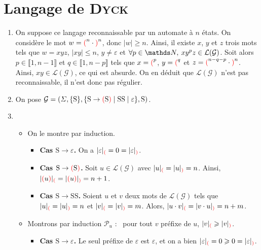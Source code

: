 \section{Langage de \textsc{Dyck}}

\begin{enumerate}
	\item On suppose ce langage reconnaissable par un automate à $n$ états. On considère le mot $w = {{\color{red}(}}^n \cdot {{\color{red})}}^n$, donc $|w| \ge n$.
		Ainsi, il existe $x$, $y$ et $z$ trois mots tels que $w = xyz$, $|xy| \le n$, $y \neq \varepsilon$ et $\forall p \in \N,\: x y^p z \in \mathcal{L}(\mathcal{G})$.
		Soit alors $p \in \llbracket 1,n-1 \rrbracket$ et $q \in \llbracket 1,n -p \rrbracket$ tels que $x = {{\color{red}(}}^p$, $y = {{\color{red}(}}^q$ et $z = {{\color{red}(}}^{n-q-p} \cdot {{\color{red})}}^n$.
		Ainsi, $xy \in \mathcal{L}(\mathcal{G})$, ce qui est absurde. On en déduit que $\mathcal{L}(\mathcal{G})$ n'est pas reconnaissable, il n'est donc pas régulier.
	\item On pose $\mathcal{G} = (\varSigma, \{\mathrm{S}\}, \{\mathrm{S} \to {\color{red}(} \mathrm{S}{\color{red})}  \mid \mathrm{SS}  \mid \varepsilon\}, \mathrm{S})$.
	\item
		\begin{itemize}
			\item On le montre par induction.
				\begin{itemize}
					\item \textbf{Cas $\mathrm{S} \to \varepsilon$.}
						On a $|\varepsilon|_{{\color{red}(}} = 0 = |\varepsilon|_{{\color{red})}}$.
					\item \textbf{Cas $\mathrm{S} \to {\color{red}(} \mathrm{S}{\color{red})}$.}
						Soit $u \in \mathcal{L}(\mathcal{G})$ avec $|u|_{{\color{red}(}} = |u|_{{\color{red})}} = n$. Ainsi, $|{\color{red}(}u{\color{red})}|_{{\color{red}(}} = |{\color{red}(}u{\color{red})}|_{{\color{red})}} = n + 1$.
					\item \textbf{Cas $\mathrm{S}\to \mathrm{SS}$.}
						Soient $u$ et $v$ deux mots de $\mathcal{L}(\mathcal{G})$ tels que $|u|_{{\color{red}(}} = |u|_{{\color{red})}} = n$ et $|v|_{{\color{red}(}} = |v|_{{\color{red})}} = m$.
						Alors, $|u\cdot v|_{{\color{red}(}} = |v\cdot u|_{{\color{red})}} = n + m$.
				\end{itemize}
			\item Montrons par induction $\mathcal{P}_{u}$ : \guillemotleft~pour tout $v$ préfixe de $u$, $|v|_{{\color{red}(}} \geqslant |v|_{{\color{red})}}$.~\guillemotright\@ 
				\begin{itemize}
					\item \textbf{Cas $\mathrm{S} \to \varepsilon$.}
						Le seul préfixe de $\varepsilon$ est $\varepsilon$, et on a bien $|\varepsilon|_{{\color{red}(}} = 0 \geqslant 0 = |\varepsilon|_{{\color{red})}}$.

\end{itemize}
\end{itemize}
\end{enumerate}
